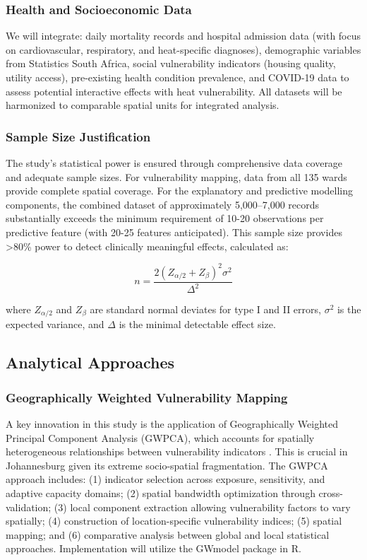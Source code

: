 \subsubsection{Health and Socioeconomic Data}
We will integrate: daily mortality records and hospital admission data (with focus on cardiovascular, respiratory, and heat-specific diagnoses), demographic variables from Statistics South Africa, social vulnerability indicators (housing quality, utility access), pre-existing health condition prevalence, and COVID-19 data to assess potential interactive effects with heat vulnerability. All datasets will be harmonized to comparable spatial units for integrated analysis.

\subsubsection{Sample Size Justification}
The study's statistical power is ensured through comprehensive data coverage and adequate sample sizes. For vulnerability mapping, data from all 135 wards provide complete spatial coverage. For the explanatory and predictive modelling components, the combined dataset of approximately 5,000--7,000 records substantially exceeds the minimum requirement of 10-20 observations per predictive feature (with 20-25 features anticipated). This sample size provides >80\% power to detect clinically meaningful effects, calculated as:

\begin{equation}
n = \frac{2(Z_{\alpha/2} + Z_{\beta})^2\sigma^2}{\Delta^2}
\end{equation}

where $Z_{\alpha/2}$ and $Z_{\beta}$ are standard normal deviates for type I and II errors, $\sigma^2$ is the expected variance, and $\Delta$ is the minimal detectable effect size.

\subsection{Analytical Approaches}

\subsubsection{Geographically Weighted Vulnerability Mapping}\label{gwpca}
A key innovation in this study is the application of Geographically Weighted Principal Component Analysis (GWPCA), which accounts for spatially heterogeneous relationships between vulnerability indicators \citep{Quispe2023, Praharaj2024}. This is crucial in Johannesburg given its extreme socio-spatial fragmentation. The GWPCA approach includes: (1) indicator selection across exposure, sensitivity, and adaptive capacity domains; (2) spatial bandwidth optimization through cross-validation; (3) local component extraction allowing vulnerability factors to vary spatially; (4) construction of location-specific vulnerability indices; (5) spatial mapping; and (6) comparative analysis between global and local statistical approaches. Implementation will utilize the GWmodel package in R.

